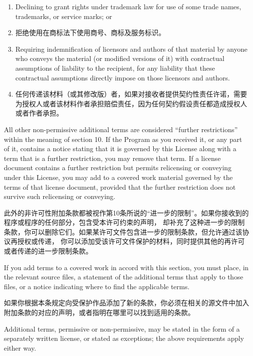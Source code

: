 \documentclass[11pt]{article}
\begin{document}
\begin{enumerate}
\begin{enumerate}
  \item Declining to grant rights under trademark law for use of some
  trade names, trademarks, or service marks; or

  \item 拒绝使用在商标法下使用商号、商标及服务标识。

  \item Requiring indemnification of licensors and authors of that
  material by anyone who conveys the material (or modified versions of
  it) with contractual assumptions of liability to the recipient, for
  any liability that these contractual assumptions directly impose on
  those licensors and authors.
  \item 任何传递该材料（或其修改版）者，如果对接收者提供契约性责任许诺，需要为授权人或者该材料作者承担赔偿责任，因为任何契约假设责任都造成授权人或者作者承担。

  \end{enumerate}

All other non-permissive additional terms are considered ``further
restrictions'' within the meaning of section 10.  If the Program as you
received it, or any part of it, contains a notice stating that it is
governed by this License along with a term that is a further
restriction, you may remove that term.  If a license document contains
a further restriction but permits relicensing or conveying under this
License, you may add to a covered work material governed by the terms
of that license document, provided that the further restriction does
not survive such relicensing or conveying.

此外的非许可性附加条款都被视作第10条所说的“进一步的限制”。如果你接收到的程序或程序的任何部分，包含受本许可约束的声明，
却补充了这种进一步的限制条款，你可以删除它们。如果某许可文件包含进一步的限制条款，但允许通过该协议再授权或传递，
你可以添加受该许可文件保护的材料，同时提供其他的再许可或者传递的进一步限制条款。

If you add terms to a covered work in accord with this section, you
must place, in the relevant source files, a statement of the
additional terms that apply to those files, or a notice indicating
where to find the applicable terms.

如果你根据本条规定向受保护作品添加了新的条款，你必须在相关的源文件中加入附加条款的对应的声明，或者指明在哪里可以找到适用的条款。

Additional terms, permissive or non-permissive, may be stated in the
form of a separately written license, or stated as exceptions;
the above requirements apply either way.


\end{enumerate}
\end{document}
